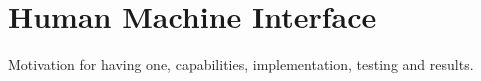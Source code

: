 \section{Human Machine Interface \label{sec:mr_hmi_sec}}

Motivation for having one, capabilities, implementation, testing and results.
